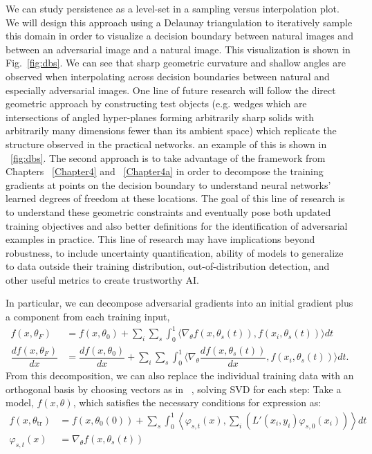 We can study persistence as a level-set in a sampling versus interpolation plot. We will design this approach using a Delaunay triangulation to iteratively sample this domain in order to visualize a decision boundary between natural images and between an adversarial image and a natural image. This visualization is shown in Fig.~\ref{fig:dbs}. We can see that sharp geometric curvature
and shallow angles are observed when interpolating across decision
boundaries between natural and especially adversarial images. One line
of future research will follow the direct geometric approach by constructing
test objects (e.g. wedges which are intersections of angled hyper-planes forming arbitrarily sharp solids with arbitrarily many dimensions fewer than its ambient space) which replicate the structure observed in the
practical networks. an example of this is shown in ~\ref{fig:dbs}. The
second approach is to take advantage of the framework from Chapters
~\ref{Chapter4} and ~\ref{Chapter4a} in order to decompose the
training gradients at points on the decision boundary to understand
neural networks' learned degrees of freedom at these locations. The
goal of this line of research is to understand these geometric
constraints and eventually pose both updated training objectives and
also better definitions for the identification of adversarial examples
in practice. This line of research may have implications beyond
robustness, to include uncertainty quantification, ability of models to generalize to data outside their training distribution,
out-of-distribution detection, and other useful metrics to create
trustworthy AI.

In particular, we can decompose adversarial gradients into an
initial gradient plus a component from each training input,
\begin{align}
  f(x, \theta_F) &= f(x, \theta_0) + \sum_i \sum_s \int_0^1 \langle
  \nabla_\theta f(x, \theta_s(t)), f(x_i, \theta_s(t))\rangle dt \\
  \dfrac{d f(x, \theta_F)}{dx} &= \dfrac{d f(x, \theta_0)}{dx} + \sum_i \sum_s \int_0^1 \langle
  \nabla_\theta \dfrac{d f(x, \theta_s(t))}{dx}, f(x_i,
                                 \theta_s(t))\rangle dt.
\end{align}
From this decomposition, we can also replace the individual training
data with an orthogonal basis by choosing vectors as in
~\citet{halko2011finding}, solving SVD for each step:
    Take a model, $f(x, \theta)$, which satisfies the necessary conditions for expression as:
 \begin{align}
     f(x, \theta_\text{tr}) &= f(x, \theta_0(0)) +  \sum_s
\int_0^1                                  \left\langle 
                                   \varphi_{s,t}(x) , \sum_i
                                   \left(L'(x_i, y_i) \varphi_{s,
                                   0}(x_i)\right) \right \rangle dt\\
     \varphi_{s,t}(x) &= \nabla_\theta f(x, \theta_s(t))
 \end{align}


